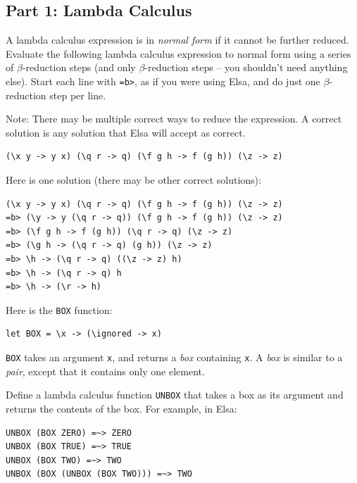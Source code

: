 \documentclass[addpoints]{exam}
\begin{document}
\begin{questions}

\subsection*{\textbf{Part 1: Lambda Calculus}}

\question[6] A lambda calculus expression is in \emph{normal form} if it cannot be further reduced.  Evaluate the following lambda calculus expression to normal form using a series of $\beta$-reduction steps (and only $\beta$-reduction steps -- you shouldn't need anything else).  Start each line with \texttt{=b>}, as if you were using Elsa, and do just one $\beta$-reduction step per line.

Note: There may be multiple correct ways to reduce the expression.  A correct solution is any solution that Elsa will accept as correct.

\begin{verbatim}
(\x y -> y x) (\q r -> q) (\f g h -> f (g h)) (\z -> z)
\end{verbatim}
\begin{solutionorbox}[5in]
Here is one solution (there may be other correct solutions):
\begin{verbatim}
(\x y -> y x) (\q r -> q) (\f g h -> f (g h)) (\z -> z)
=b> (\y -> y (\q r -> q)) (\f g h -> f (g h)) (\z -> z)
=b> (\f g h -> f (g h)) (\q r -> q) (\z -> z)
=b> (\g h -> (\q r -> q) (g h)) (\z -> z)
=b> \h -> (\q r -> q) ((\z -> z) h)
=b> \h -> (\q r -> q) h
=b> \h -> (\r -> h)
\end{verbatim}
\end{solutionorbox}

\newpage

\question[5]

Here is the \texttt{BOX} function:

\begin{verbatim}
let BOX = \x -> (\ignored -> x)
\end{verbatim}

\texttt{BOX} takes an argument \texttt{x}, and returns a \emph{box} containing \texttt{x}.  A \emph{box} is similar to a \emph{pair}, except that it contains only one element.

Define a lambda calculus function \texttt{UNBOX} that takes a box as its argument and returns the contents of the box.  For example, in Elsa:

\begin{verbatim}
UNBOX (BOX ZERO) =~> ZERO
UNBOX (BOX TRUE) =~> TRUE
UNBOX (BOX TWO) =~> TWO
UNBOX (BOX (UNBOX (BOX TWO))) =~> TWO
\end{verbatim}


\end{questions}
\end{document}
